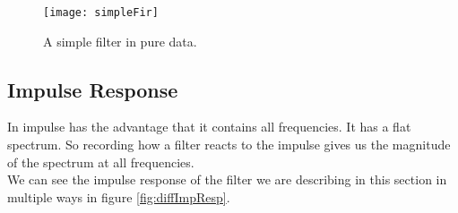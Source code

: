 \begin{figure}[H]
	\centering
	\texttt{[image: simpleFir]}
	\caption[FIR filter in pd]
	{A simple filter in pure data.}
	\label{fig:pdSimpleFir}
\end{figure}


\subsection{Impulse Response}

In impulse has the advantage that it contains all frequencies. It has a flat spectrum.  So recording how a filter reacts to the impulse gives us the magnitude of the spectrum at all frequencies.\\
We can see the impulse response of the filter we are describing in this section in  multiple ways in figure \ref{fig:diffImpResp}.










